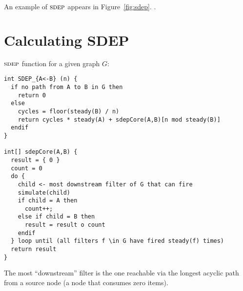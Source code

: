 An example of $\textsc{sdep}$ appears in
Figure~\ref{fig:sdep}. .

\section{Calculating SDEP}

$\textsc{sdep}$ function for a given graph $G$:

{\scriptsize
\begin{verbatim}
int SDEP_{A<-B} (n) {
  if no path from A to B in G then
    return 0
  else
    cycles = floor(steady(B) / n)
    return cycles * steady(A) + sdepCore(A,B)[n mod steady(B)]
  endif
}

int[] sdepCore(A,B) {
  result = { 0 }
  count = 0
  do {
    child <- most downstream filter of G that can fire
    simulate(child)
    if child = A then
      count++;
    else if child = B then
      result = result o count
    endif
  } loop until (all filters f \in G have fired steady(f) times)
  return result
}
\end{verbatim}}

The most ``downstream'' filter is the one reachable via the longest
acyclic path from a source node (a node that consumes zero items).
